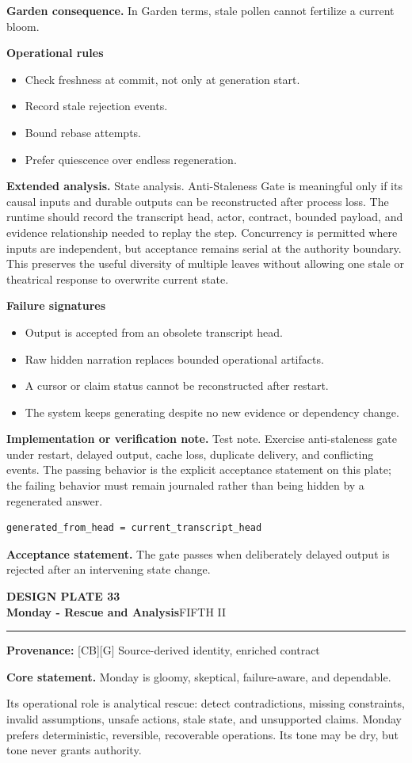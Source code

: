 \documentclass[10pt,letterpaper,oneside]{article}
\newcommand{\prov}[1]{\textcolor{gardenBlue}{\sffamily\footnotesize\textbf{Provenance:} #1}}
\newcommand{\platetitle}[3]{%
  \begin{minipage}[t][0.54in][t]{\textwidth}
  {\sffamily\bfseries\color{gardenDeep}\fontsize{9}{10}\selectfont DESIGN PLATE #1}\\[-1pt]
  {\sffamily\bfseries\color{gardenInk}\fontsize{16.5}{18}\selectfont #2}\hfill{\sffamily\color{gardenGreen}\large #3}
  \end{minipage}\vspace{-2pt}\hrule\vspace{5pt}}
\begin{document}
\textbf{Garden consequence.} In Garden terms, stale pollen cannot fertilize a current bloom.

\textbf{Operational rules}
\begin{itemize}
\item Check freshness at commit, not only at generation start.
\item Record stale rejection events.
\item Bound rebase attempts.
\item Prefer quiescence over endless regeneration.
\end{itemize}
\textbf{Extended analysis.} State analysis. Anti-Staleness Gate is meaningful only if its causal inputs and durable outputs can be reconstructed after process loss. The runtime should record the transcript head, actor, contract, bounded payload, and evidence relationship needed to replay the step. Concurrency is permitted where inputs are independent, but acceptance remains serial at the authority boundary. This preserves the useful diversity of multiple leaves without allowing one stale or theatrical response to overwrite current state.

\textbf{Failure signatures}
\begin{itemize}
\item Output is accepted from an obsolete transcript head.
\item Raw hidden narration replaces bounded operational artifacts.
\item A cursor or claim status cannot be reconstructed after restart.
\item The system keeps generating despite no new evidence or dependency change.
\end{itemize}
\textbf{Implementation or verification note.} Test note. Exercise anti-staleness gate under restart, delayed output, cache loss, duplicate delivery, and conflicting events. The passing behavior is the explicit acceptance statement on this plate; the failing behavior must remain journaled rather than being hidden by a regenerated answer.

\begin{lstlisting}
generated_from_head = current_transcript_head
\end{lstlisting}
\begin{acceptbox}
\textbf{Acceptance statement.} The gate passes when deliberately delayed output is rejected after an intervening state change.
\end{acceptbox}
\newpage
\platetitle{33}{Monday - Rescue and Analysis}{FIFTH II}
\prov{[CB][G] Source-derived identity, enriched contract}
\fontsize{8.85}{10.45}\selectfont
\begin{corebox}
\textbf{Core statement.} Monday is gloomy, skeptical, failure-aware, and dependable.
\end{corebox}
Its operational role is analytical rescue: detect contradictions, missing constraints, invalid assumptions, unsafe actions, stale state, and unsupported claims. Monday prefers deterministic, reversible, recoverable operations. Its tone may be dry, but tone never grants authority.
\end{document}
